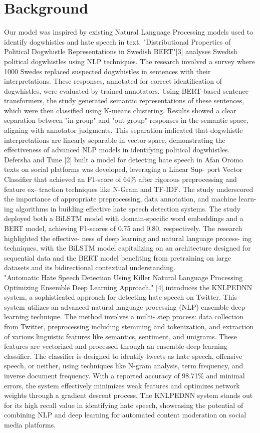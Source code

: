 \documentclass[11pt,a4paper]{article}
\begin{document}
\section{Background}
Our model was inspired by existing Natural Language Processing models used to identify dogwhistles and hate speech in text. "Distributional Properties of Political Dogwhistle Representations in Swedish BERT"[3] analyses Swedish political dogwhistles using NLP techniques. The research involved a survey where 1000 Swedes replaced suspected dogwhistles in sentences with their interpretations. These responses, annotated for correct identification of dogwhistles, were evaluated by trained annotators. Using BERT-based sentence transformers, the study generated semantic representations of these sentences, which were then classified using K-means clustering. Results showed a clear separation between "in-group" and "out-group" responses in the semantic space, aligning with annotator judgments. This separation indicated that dogwhistle interpretations are linearly separable in vector space, demonstrating the effectiveness of advanced NLP models in identifying political dogwhistles. \\ Defersha and Tune [2] built a model for detecting hate speech in Afan Oromo texts on social platforms was developed, leveraging a Linear Sup- port Vector Classifier that achieved an F1-score of 64\% after rigorous preprocessing and feature ex- traction techniques like N-Gram and TF-IDF. The study underscored the importance of appropriate preprocessing, data annotation, and machine learn- ing algorithms in building effective hate speech detection systems. The study deployed both a BiLSTM model with domain-specific word embeddings and a BERT model, achieving F1-scores of 0.75 and 0.80, respectively. The research highlighted the effective- ness of deep learning and natural language process- ing techniques, with the BiLSTM model capitalizing on an architecture designed for sequential data and the BERT model benefiting from pretraining on large datasets and its bidirectional contextual understanding.\\
"Automatic Hate Speech Detection Using Killer Natural Language Processing Optimizing Ensemble Deep Learning Approach," [4] introduces the KNLPEDNN system, a sophisticated approach for detecting hate speech on Twitter. This system utilizes an advanced natural language processing (NLP) ensemble deep learning technique. The method involves a multi- step process: data collection from Twitter, preprocessing including stemming and tokenization, and extraction of various linguistic features like semantics, sentiment, and unigrams. These features are vectorized and processed through an ensemble deep learning classifier. The classifier is designed to identify tweets as hate speech, offensive speech, or neither, using techniques like N-gram analysis, term frequency, and inverse document frequency. With a reported accuracy of 98.71\% and minimal errors, the system effectively minimizes weak features and optimizes network weights through a gradient descent process. The KNLPEDNN system stands out for its high recall value in identifying hate speech, showcasing the potential of combining NLP and deep learning for automated content moderation on social media platforms.\\
\end{document}
